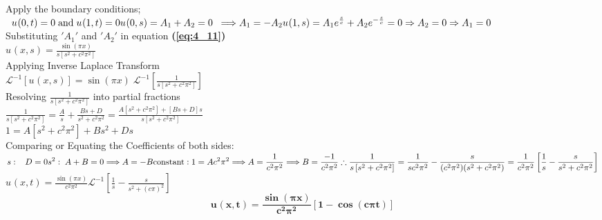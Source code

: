 \documentclass[12pt]{report}
\newcommand{\Laplace}{\mathcal{L}}
\newcommand{\sbracket}[1]{\left[#1\right]}
\newcommand{\Un}[2]{u_{#1}(#2)}
\newcommand{\NI}{\noindent}
\newcommand{\psq}{\pi^{2}}
\newcommand{\InverseL}[1]{\Laplace^{-1}\left[#1\right]}
\newcommand{\bt}[1]{\textbf{#1}}
\newcommand{\refn}[1]{\bt{(\ref{#1})}}
\begin{document}
\NI Apply the boundary conditions;
$\displaystyle
\; \; \Un{}{0,t} = 0 \; \text{and} \; \Un{}{1,t} = 0 \\[0.2cm]
\Un{}{0,s} = A_1 + A_2 = 0 \; \; \Longrightarrow A_1 = - A_2 \\[0.1cm]
\Un{}{1,s} = A_1 e^{\frac{s}{c}} + A_2 e^{- \frac{s}{c}} = 0 \Rightarrow A_2 = 0 \Rightarrow A_1 = 0
$\\[0.3cm]

\NI Substituting $'A_1'$ and $'A_2'$ in equation \refn{eq:4_11} \\[0.2cm]
$\displaystyle
\Un{}{x,s} = \frac{\sin(\pi x)}{s \left[s^{2} + c^{2}\psq \right]}
$\\[1cm]

\NI Applying Inverse Laplace Transform \\[0.2cm]
$\displaystyle
\InverseL{\Un{}{x,s}} = \sin(\pi x) \; \InverseL{\frac{1}{s\sbracket{s^{2} + c^{2}\psq}}}
$\\[0.3cm]

\NI Resolving $\displaystyle \frac{1}{s\sbracket{s^{2} + c^{2}\psq}}$ into partial fractions \\[0.2cm]
$\displaystyle
\frac{1}{s\sbracket{s^{2} + c^{2}\psq}} = \frac{A}{s} + \frac{Bs + D}{s^{2} + c^{2}\psq} = \frac{A\sbracket{s^2 + c^2 \psq} + \sbracket{Bs + D}s}{s\sbracket{s^2 + c^2 \psq}}
$\\[0.3cm]
$\displaystyle
1 = A \sbracket{s^2 + c^2 \psq} + Bs^2 + Ds
$\\[0.3cm]


\NI Comparing or Equating the Coefficients of both sides: \\[0.2cm]
$ \displaystyle
s: \; \; \; D = 0 \\
s^2: \; A + B = 0 \Longrightarrow A = - B  \\
\text{constant}: 1 = A c^2 \psq \Longrightarrow A = \frac{1}{c^2 \psq} \Longrightarrow B = \frac{-1}{c^2 \psq}\\[0.3cm]
\therefore \frac{1}{s\sbracket{s^2 + c^2 \psq}} = \frac{1}{s c^2 \psq} - \frac{s}{(c^2 \psq)(s^2 + c^2 \psq)} = \frac{1}{c^2 \psq} \sbracket{\frac{1}{s} - \frac{s}{s^2 + c^2 \psq}}
$\\[0.2cm]

$ \displaystyle
\Un{}{x,t} = \frac{\sin(\pi x)}{c^2 \psq} \InverseL{\frac{1}{s} - \frac{s}{s^2 + (c\pi)^2}}
$\\[0.2cm]

$$ \displaystyle \mathbf{
\Un{}{x,t} = \frac{\sin(\pi x)}{c^2 \psq}\sbracket{1 - \cos(c\pi t)}
}$$\\[0.2cm]
\end{document}
